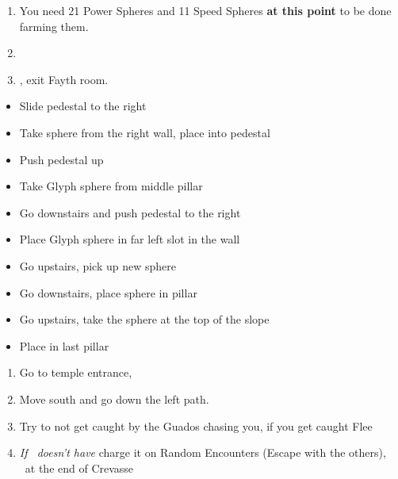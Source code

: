 \begin{enumerate}[resume]
    \item You need 21 Power Spheres and 11 Speed Spheres \textbf{at this point} to be done farming them.
    \item \formation{\rikku}{\tidus}{\yuna}
    \item \save, exit Fayth room.
\end{enumerate}
\begin{trial}
    \begin{itemize}
        \item Slide pedestal to the right
        \item Take sphere from the right wall, place into pedestal
        \item Push pedestal up
        \item Take Glyph sphere from middle pillar
        \item Go downstairs and push pedestal to the right
        \item Place Glyph sphere in far left slot in the wall
        \item Go upstairs, pick up new sphere
        \item Go downstairs, place sphere in pillar
        \item Go upstairs, take the sphere at the top of the slope
        \item Place in last pillar
    \end{itemize}
\end{trial}
\begin{enumerate}[resume]
    \item Go to temple entrance, \sd
    \item Move south and go down the left path.
    \item Try to not get caught by the Guados chasing you, if you get caught Flee
    \item \textit{If \rikku\ doesn't have \od} charge it on Random Encounters (Escape with the others), \save\ at the end of Crevasse
\end{enumerate}
